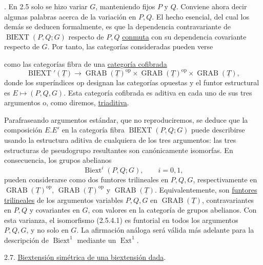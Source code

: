 \par\medskip{}. En 2.5 solo se hizo variar $G$, manteniendo fijos $P$ y $Q$.
Conviene ahora decir algunas palabras acerca de la variación en $P,Q$.
El hecho esencial, del cual los demás se deducen formalmente, es que la
dependencia contravariante de $\operatorname{BIEXT}(P,Q;G)$ respecto
de $P,Q$ \underline{conmuta} con su dependencia covariante respecto de
$G$. Por tanto, las categorías consideradas pueden verse


como las categorías fibra de una \underline{categoría cofibrada}
\begin{equation}\tag{2.6.1}
 \operatorname{BIEXT}'(\underline T)
 \longrightarrow
 \operatorname{GRAB}(\underline T)^{\mathrm{op}}\times
 \operatorname{GRAB}(\underline T)^{\mathrm{op}}\times
 \operatorname{GRAB}(\underline T),
\end{equation}
donde los superíndices $\mathrm{op}$ designan las categorías opuestas y
el funtor estructural es $E\mapsto(P,Q,G)$. Esta categoría cofibrada es
aditiva en cada uno de sus tres argumentos o, como diremos,
\underline{triaditiva}.

Parafraseando argumentos estándar, que no reproduciremos, se deduce
que la composición $E.E'$ en la categoría fibra
%
      {$\operatorname{BIEXT}(P,Q;G)$}
puede describirse usando la estructura aditiva de cualquiera de los
tres argumentos: las tres estructuras de pseudogrupo resultantes son
canónicamente isomorfas. En consecuencia, los grupos abelianos
\begin{equation}\tag{2.6.2}
 \operatorname{Biext}^{i}(P,Q;G),\qquad i=0,1,
\end{equation}
pueden considerarse como dos funtores trilineales en $P,Q,G$,
respectivamente en $\operatorname{GRAB}(\underline T)^{\mathrm{op}}$,
$\operatorname{GRAB}(\underline T)^{\mathrm{op}}$ y
$\operatorname{GRAB}(\underline T)$. Equivalentemente, son
\underline{funtores trilineales} de los argumentos variables $P,Q,G$
en $\operatorname{GRAB}(\underline T)$, contravariantes en $P,Q$ y
covariantes en $G$, con valores en la categoría de grupos abelianos.
Con esta varianza, el isomorfismo (2.5.4.1) es funtorial en todos los
argumentos $P,Q,G$, y no solo en $G$. La afirmación análoga será válida
más adelante para la descripción de $\operatorname{Biext}^{1}$
mediante un $\operatorname{Ext}^{1}$.

2.7. \underline{Biextensión simétrica de una biextensión dada}.

